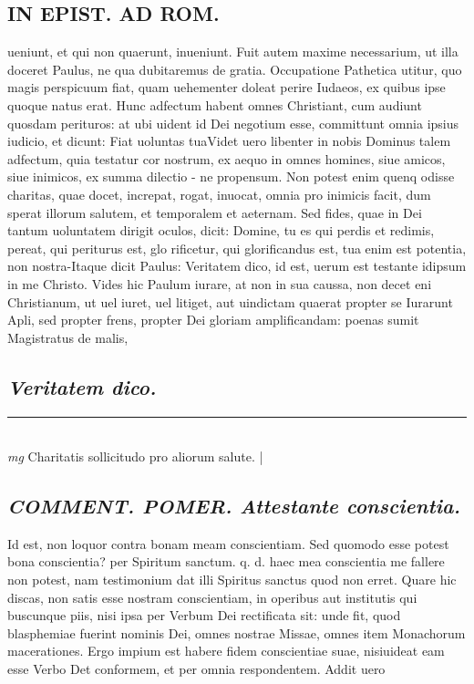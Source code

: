 \documentclass{article}
\begin{document}
\begin{pages}
\section*{IN EPIST. AD ROM.  }
\marginpar{[ p.108 ]}\pstart ueniunt, et qui non quaerunt, inueniunt. Fuit autem maxime necessarium, ut illa doceret Paulus, ne qua dubitaremus de gratia.   \pend\pstart Occupatione Pathetica utitur, quo magis perspicuum fiat, quam uehementer doleat perire Iudaeos, ex quibus ipse quoque natus erat. Hunc adfectum habent omnes Christiant, cum audiunt quosdam perituros: at ubi uident id Dei negotium esse, committunt omnia ipsius iudicio, et dicunt: Fiat uoluntas tuaVidet uero libenter in nobis Dominus talem adfectum, quia testatur cor nostrum, ex aequo in omnes homines, siue amicos, siue inimicos, ex summa dilectio - ne propensum. Non potest enim quenq odisse charitas, quae docet, increpat, rogat, inuocat, omnia pro inimicis facit, dum sperat illorum salutem, et temporalem et aeternam. Sed fides, quae in Dei tantum uoluntatem dirigit oculos, dicit: Domine, tu es qui perdis et redimis, pereat, qui periturus est, glo rificetur, qui glorificandus est, tua enim est potentia, non nostra-Itaque dicit Paulus: Veritatem dico, id est, uerum est testante idipsum in me Christo. Vides hic Paulum iurare, at non in sua caussa, non decet eni Christianum, ut uel iuret, uel litiget, aut uindictam quaerat propter se Iurarunt Apli, sed propter frens, propter Dei gloriam amplificandam: poenas sumit Magistratus de malis,  \pend
{}
{}
\subsection*{\textit{Veritatem dico. }}
\vspace{0.5cm}\noindent
\vspace{0.2cm}\rule{1cm}{0.2pt}\\ 
\hspace{0.2cm}\textit{mg}
\footnotesize Charitatis sollicitudo pro aliorum salute.  
\normalsize| 
\marginpar{[ p.non ]}
{}
\subsection*{\textit{\huge\textbf{COMMENT. POMER. }\normalsize Attestante conscientia. }}\pstart Id est, non loquor contra bonam meam conscientiam. Sed quomodo esse potest bona conscientia? per Spiritum sanctum. q. d. haec mea conscientia me fallere non potest, nam testimonium dat illi Spiritus sanctus quod non erret. Quare hic discas, non satis esse nostram conscientiam, in operibus aut institutis qui buscunque piis, nisi ipsa per Verbum Dei rectificata sit: unde fit, quod blasphemiae fuerint nominis Dei, omnes nostrae Missae, omnes item Monachorum macerationes. Ergo impium est habere fidem conscientiae suae, nisiuideat eam esse Verbo Det conformem, et per omnia respondentem. Addit uero  \pend
{}
{}

\end{pages}
\end{document}

